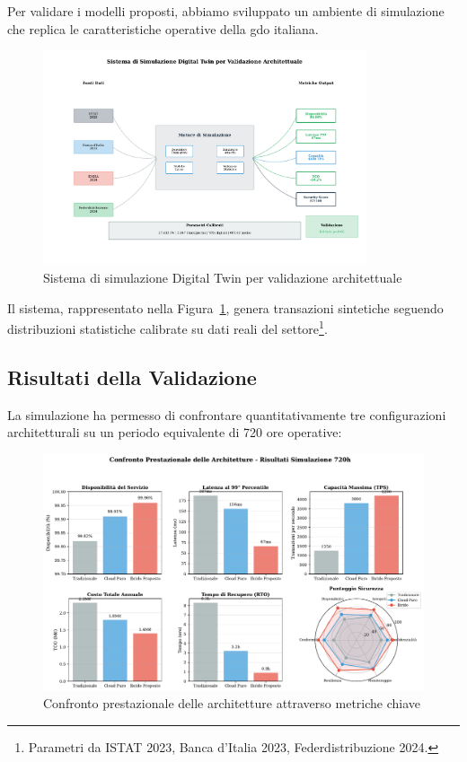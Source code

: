 \documentclass[12pt,a4paper,oneside]{book}
\begin{document}
Per validare i modelli proposti, abbiamo sviluppato un ambiente di simulazione che replica le caratteristiche operative della \gls{gdo} italiana.

\begin{figure}[htbp]
\centering
\includegraphics[width=0.85\textwidth]{fig_3_4_simulation_system.pdf}
\caption{Sistema di simulazione Digital Twin per validazione architettuale}
\label{fig:simulation-system}
\end{figure}

Il sistema, rappresentato nella Figura~\ref{fig:simulation-system}, genera transazioni sintetiche seguendo distribuzioni statistiche calibrate su dati reali del settore\footnote{Parametri da ISTAT 2023, Banca d'Italia 2023, Federdistribuzione 2024.}.

\subsection{Risultati della Validazione}
\label{subsec:risultati-validazione}

La simulazione ha permesso di confrontare quantitativamente tre configurazioni architetturali su un periodo equivalente di 720 ore operative:

\begin{figure}[htbp]
\centering
\includegraphics[width=\textwidth]{fig_3_6_performance_comparison.pdf}
\caption{Confronto prestazionale delle architetture attraverso metriche chiave}
\label{fig:performance-comparison}
\end{figure}
\end{document}
